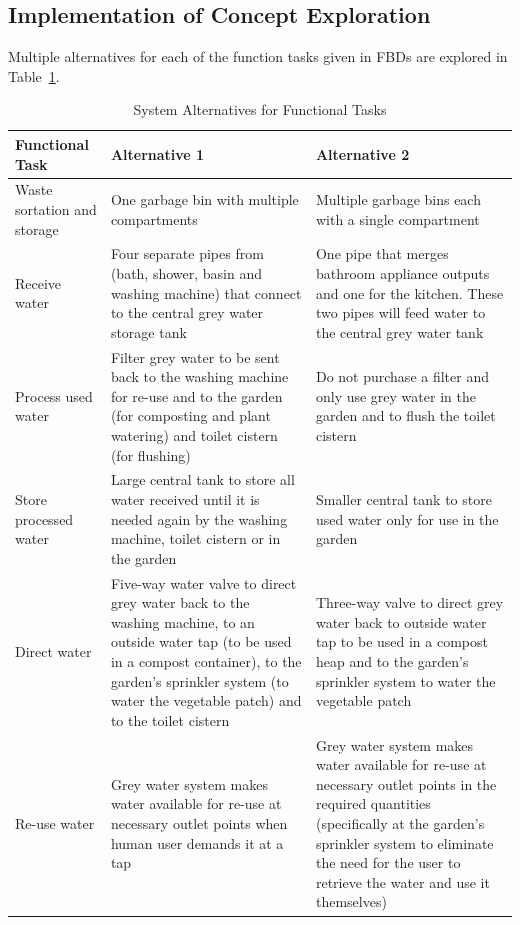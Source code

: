 \documentclass[a4paper,11pt,fleqn]{report}
\begin{document}
\subsection{Implementation of Concept Exploration}
Multiple alternatives for each of the function tasks given in \ac{FBD}s are explored in Table~\ref{tb: FunctionalTasks}.
%
\begin{table}[h!]
\caption {System Alternatives for Functional Tasks} \label{tb: FunctionalTasks} 
\begin{center}
\begin{tabular}{p{3.5cm}|p{6cm}|p{6cm}}\toprule
	{\textbf{Functional Task}} & {\textbf{Alternative 1}} & {\textbf{Alternative 2}}\\ \midrule
    Waste sortation and storage & One garbage bin with multiple compartments & Multiple garbage bins each with a single compartment\\
    \hline
    Receive water & Four separate pipes from (bath, shower, basin and washing machine) that connect to the central grey water storage tank & One pipe that merges bathroom appliance outputs and one for the kitchen. These two pipes will feed water to the central grey water tank\\
    \hline
    Process used water & Filter grey water to be sent back to the washing machine for re-use and to the garden (for composting and plant watering) and toilet cistern (for flushing) & Do not purchase a filter and only use grey water in the garden and to flush the toilet cistern\\
    \hline
    Store processed water & Large central tank to store all water received until it is needed again by the washing machine, toilet cistern or in the garden & Smaller central tank to store used water only for use in the garden\\
    \hline
    Direct water & Five-way water valve to direct grey water back to the washing machine, to an outside water tap (to be used in a compost container), to the garden's sprinkler system (to water the vegetable patch) and to the toilet cistern & Three-way valve to direct grey water back to outside water tap to be used in a compost heap and to the garden's sprinkler system to water the vegetable patch\\
    \hline
    Re-use water & Grey water system makes water available for re-use at necessary outlet points when human user demands it at a tap & Grey water system makes water available for re-use at necessary outlet points in the required quantities (specifically at the garden's sprinkler system to eliminate the need for the user to retrieve the water and use it themselves)\\

\end{tabular}
\end{center}
\end{table}
\end{document}
